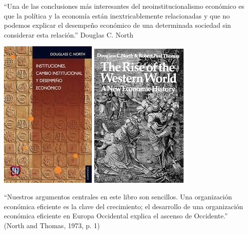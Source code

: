 \documentclass{beamer}
\begin{document}
\begin{frame}
    \centering
    \begin{boxA}
        \footnotesize
        \centering
        “Una de las conclusiones más interesantes del neoinstitucionalismo económico es que la política y la economía están inextricablemente relacionadas y que no podemos explicar el desempeño económico de una determinada sociedad sin considerar esta relación.” Douglas C. North
    \end{boxA}
    \includegraphics[scale=0.35]{../Figures/North (1990).jpg}
    \includegraphics[scale=0.35]{../Figures/North and Thomas book.jpg}
    \begin{boxA}
        \footnotesize
        \centering
        “Nuestros argumentos centrales en este libro son sencillos. Una organización económica eficiente es la clave del crecimiento; el desarrollo de una organización económica eficiente en Europa Occidental explica el ascenso de Occidente.” (North and Thomas, 1973, p. 1)
    \end{boxA}
\end{frame}
\end{document}
